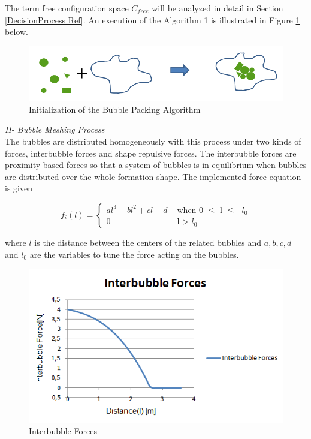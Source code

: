 The term free configuration space $C_{free}$ will be analyzed in detail in Section \ref{DecisionProcess Ref}. An execution of the Algorithm 1 is illustrated in Figure \ref{algorithm1_ref} below.
		
\begin{figure}[H]
\caption{Initialization of the Bubble Packing Algorithm} \label{algorithm1_ref}
\centering
\includegraphics[scale = 0.50]{bubble_packing}
\end{figure}
				
\textit{			II- Bubble Meshing Process } \\ 
The bubbles are distributed homogeneously with this process under two kinds of forces, interbubble forces and shape repulsive forces. The interbubble forces are proximity-based forces so that a system of bubbles is in equilibrium when bubbles are distributed over the whole formation shape. The implemented force equation is given
		
\begin{equation}
f_i(l) = \left\{ \begin{array}{rl}
al^3 + bl^2 + cl + d &\mbox{ when 0 $\leq$ l $\leq$ $l_0$} \\
0                               &\mbox{ l > $l_0$}
\end{array} \right.
\end{equation}

where $l$ is the distance between the centers of the related bubbles and $a,b,c,d$ and $l_0$ are the variables to tune the force acting on the bubbles. 

\begin{figure}[H]
\caption{Interbubble Forces}
\centering
\includegraphics[scale = 0.70]{interbubble_forces}
\end{figure}
	
